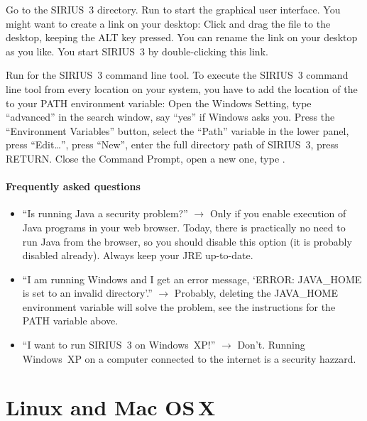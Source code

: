 \documentclass[letterpaper,10pt,openany,oneside]{sphinxmanual}
\begin{document}
Go to the SIRIUS~3 directory.  Run  to start the
graphical user interface.  You might want to create a link on your desktop:
Click and drag the file  to the desktop, keeping the
ALT key pressed.  You can rename the link on your desktop as you like.  You
start SIRIUS~3 by double-clicking this link.

Run  for the SIRIUS~3 command line tool.  To
execute the SIRIUS~3 command line tool from every location on your system,
you have to add the location of the  to your PATH
environment variable: Open the Windows Setting, type ``advanced'' in the
search window, say ``yes'' if Windows asks you.  Press the ``Environment
Variables'' button, select the ``Path'' variable in the lower panel, press
``Edit\dots'', press ``New'', enter the full directory path of SIRIUS~3,
press RETURN.  Close the Command Prompt, open a new one,
type .

\paragraph{Frequently asked questions}

\begin{itemize}
\item ``Is running Java a security problem?''  $\to$ Only if you enable
  execution of Java programs in your web browser. Today, there is practically
  no need to run Java from the browser, so you should disable this option (it
  is probably disabled already).  Always keep your JRE up-to-date.

\item ``I am running Windows and I get an error message, `ERROR: JAVA\_HOME is
  set to an invalid directory'.'' $\to$ Probably, deleting the JAVA\_HOME
  environment variable will solve the problem, see the instructions for the
  PATH variable above.

\item ``I want to run SIRIUS~3 on Windows~XP!''  $\to$ Don't.  Running
  Windows~XP on a computer connected to the internet is a security hazzard.
\end{itemize}



\section{Linux and Mac OS\,X}
\label{install:linux-and-macosx}
\end{document}
